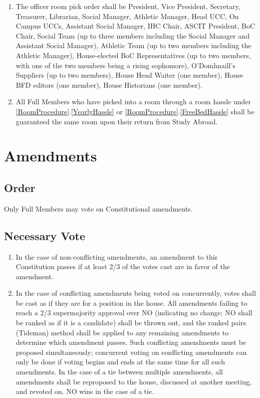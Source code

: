 \documentclass[10pt]{article} %
\begin{document}
\begin{enumerate}
\begin{enumerate}
\end{enumerate}
\item \label{OfficerRoomOrder}The officer room pick order shall be President, Vice President, Secretary, Treasurer, Librarian, Social Manager, Athletic Manager, Head UCC, On Campus UCCs, Assistant Social Manager, IHC Chair, ASCIT President, BoC Chair, Social Team (up to three members including the Social Manager and Assistant Social Manager), Athletic Team (up to two members including the Athletic Manager), House-elected BoC Representatives (up to two members, with one of the two members being a rising sophomore), O’Domhnaill’s Suppliers (up to two members), House Head Waiter (one member), House BFD editors (one member), House Historians (one member).
\item All Full Members who have picked into a room through a room hassle under \ref{RoomProcedure}.\ref{YearlyHassle} or \ref{RoomProcedure}.\ref{FreeBedHassle} shall be guaranteed the same room upon their return from Study Abroad.
\end{enumerate}
\section{Amendments}
\subsection{Order}
Only Full Members may vote on Constitutional amendments.
\subsection{Necessary Vote}
\begin{enumerate}
\item In the case of non-conflicting amendments, an amendment to this Constitution passes if at least 2/3 of the votes cast are in favor of the amendment.
\item In the case of conflicting amendments being voted on concurrently, votes shall be cast as if they are for a position in the house. All amendments failing to reach a 2/3 supermajority approval over NO (indicating no change; NO shall be ranked as if it is a candidate) shall be thrown out, and the ranked pairs (Tideman) method shall be applied to any remaining amendments to determine which amendment passes. Such conflicting amendments must be proposed simultaneously; concurrent voting on conflicting amendments can only be done if voting begins and ends at the same time for all such amendments. In the case of a tie between multiple amendments, all amendments shall be reproposed to the house, discussed at another meeting, and revoted on. NO wins in the case of a tie.
\end{enumerate}
\end{document}
